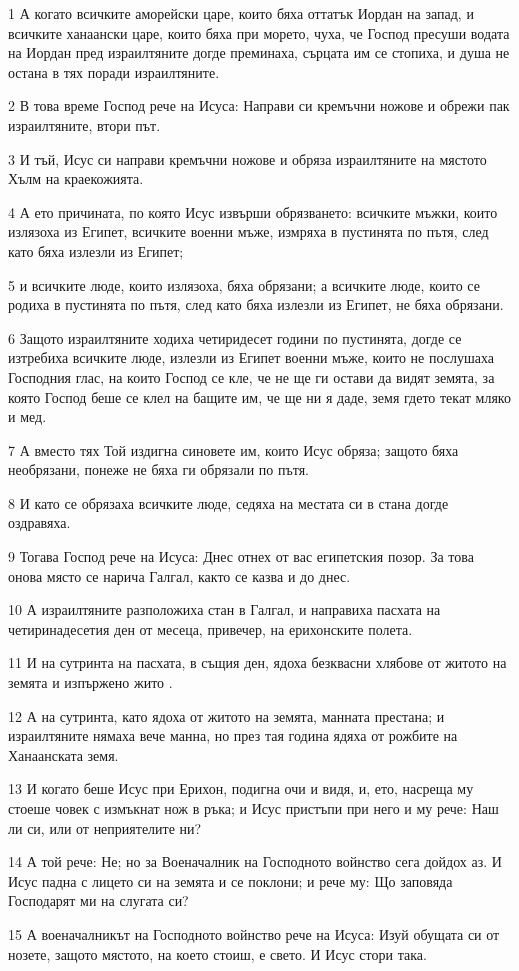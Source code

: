 \par 1 А когато всичките аморейски царе, които бяха оттатък Иордан на запад, и всичките ханаански царе, които бяха при морето, чуха, че Господ пресуши водата на Иордан пред израилтяните догде преминаха, сърцата им се стопиха, и душа не остана в тях поради израилтяните.
\par 2 В това време Господ рече на Исуса: Направи си кремъчни ножове и обрежи пак израилтяните, втори път.
\par 3 И тъй, Исус си направи кремъчни ножове и обряза израилтяните на мястото Хълм на краекожията.
\par 4 А ето причината, по която Исус извърши обрязването: всичките мъжки, които излязоха из Египет, всичките военни мъже, измряха в пустинята по пътя, след като бяха излезли из Египет;
\par 5 и всичките люде, които излязоха, бяха обрязани; а всичките люде, които се родиха в пустинята по пътя, след като бяха излезли из Египет, не бяха обрязани.
\par 6 Защото израилтяните ходиха четиридесет години по пустинята, догде се изтребиха всичките люде, излезли из Египет военни мъже, които не послушаха Господния глас, на които Господ се кле, че не ще ги остави да видят земята, за която Господ беше се клел на бащите им, че ще ни я даде, земя гдето текат мляко и мед.
\par 7 А вместо тях Той издигна синовете им, които Исус обряза; защото бяха необрязани, понеже не бяха ги обрязали по пътя.
\par 8 И като се обрязаха всичките люде, седяха на местата си в стана догде оздравяха.
\par 9 Тогава Господ рече на Исуса: Днес отнех от вас египетския позор. За това онова място се нарича Галгал, както се казва и до днес.
\par 10 А израилтяните разположиха стан в Галгал, и направиха пасхата на четиринадесетия ден от месеца, привечер, на ерихонските полета.
\par 11 И на сутринта на пасхата, в същия ден, ядоха безквасни хлябове от житото на земята и изпържено жито .
\par 12 А на сутринта, като ядоха от житото на земята, манната престана; и израилтяните нямаха вече манна, но през тая година ядяха от рожбите на Ханаанската земя.
\par 13 И когато беше Исус при Ерихон, подигна очи и видя, и, ето, насреща му стоеше човек с измъкнат нож в ръка; и Исус пристъпи при него и му рече: Наш ли си, или от неприятелите ни?
\par 14 А той рече: Не; но за Военачалник на Господното войнство сега дойдох аз. И Исус падна с лицето си на земята и се поклони; и рече му: Що заповяда Господарят ми на слугата си?
\par 15 А военачалникът на Господното войнство рече на Исуса: Изуй обущата си от нозете, защото мястото, на което стоиш, е свето. И Исус стори така.

